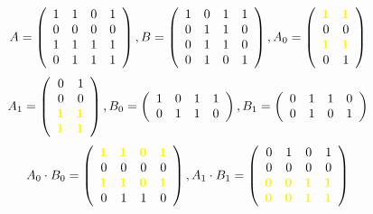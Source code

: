 \documentclass[11pt]{beamer}
\def\hlt{\color{yellow}}
\newcommand{\memph}[1]{{\hlt{\bf #1}}}
\begin{document}
\begin{frame}
\begin{small}
$$A = \left(\begin{array}{rrrr}
1 & 1 & 0 & 1 \\
0 & 0 & 0 & 0 \\
1 & 1 & 1 & 1 \\
0 & 1 & 1 & 1
\end{array}\right), B = \left(\begin{array}{rrrr}
1 & 0 & 1 & 1 \\
0 & 1 & 1 & 0 \\
0 & 1 & 1 & 0 \\
0 & 1 & 0 & 1
\end{array}\right), A_0 = \left(\begin{array}{rr}
\memph{1} & \memph{1} \\
0 & 0 \\
\memph{1} & \memph{1} \\
0 & 1
\end{array}\right)$$
$$
A_1 = \left(\begin{array}{rr}
0 & 1 \\
0 & 0 \\
\memph{1} & \memph{1} \\
\memph{1} & \memph{1}
\end{array}\right), B_0 = \left(\begin{array}{rrrr}
1 & 0 & 1 & 1 \\
0 & 1 & 1 & 0
\end{array}\right), B_1 = \left(\begin{array}{rrrr}
0 & 1 & 1 & 0 \\
0 & 1 & 0 & 1
\end{array}\right)
$$
$$
A_0 \cdot B_0 = \left(\begin{array}{rrrr}
\memph{1} & \memph{1} & \memph{0} & \memph{1} \\
0 & 0 & 0 & 0 \\
\memph{1} & \memph{1} & \memph{0} & \memph{1} \\
0 & 1 & 1 & 0
\end{array}\right), A_1 \cdot B_1 = \left(\begin{array}{rrrr}
0 & 1 & 0 & 1 \\
0 & 0 & 0 & 0 \\
\memph{0} & \memph{0} & \memph{1} & \memph{1} \\
\memph{0} & \memph{0} & \memph{1} & \memph{1}
\end{array}\right)$$
\end{small}
\end{frame}
\end{document}
